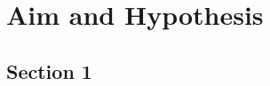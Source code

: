 
\chapter{Aim and Hypothesis}
\label{chapter 2}
\ifpdf
    \graphicspath{{Chapter2/Figs/}{Chapter2/Figs/PDF/}{Chapter2/Figs/}}
\else
    \graphicspath{{Chapter2/Figs/Vector/}{Chapter2/Figs/}}
\fi
\section{Section 1}
\label{section 2.1}


